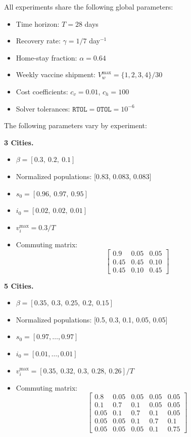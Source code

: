 \documentclass[letterpaper, 10 pt, conference]{ieeeconf}
\begin{document}
All experiments share the following global parameters:
\begin{itemize}
  \item Time horizon: $T = 28$ days
  \item Recovery rate: $\gamma = 1/7$ day$^{-1}$
  \item Home-stay fraction: $\alpha = 0.64$
  \item Weekly vaccine shipment: $V_w^{\max} = \{1, 2, 3, 4\} / 30$
  \item Cost coefficients: $c_v = 0.01$, $c_h = 100$
  \item Solver tolerances: $\texttt{RTOL} = \texttt{OTOL} = 10^{-6}$
\end{itemize}

The following parameters vary by experiment:

\textbf{3 Cities.}
\begin{itemize}
  \item $\beta = [0.3,\ 0.2,\ 0.1]$
  \item Normalized populations: [0.83, 0.083, 0.083]
  \item $s_0 = [0.96,\ 0.97,\ 0.95]$
  \item $i_0 = [0.02,\ 0.02,\ 0.01]$
  \item $v_i^{\max} = 0.3 / T$
  \item Commuting matrix:
  \[
  \begin{bmatrix}
    0.9 & 0.05 & 0.05 \\
    0.45 & 0.45 & 0.10 \\
    0.45 & 0.10 & 0.45
  \end{bmatrix}
  \]
\end{itemize}

\textbf{5 Cities.}
\begin{itemize}
  \item $\beta = [0.35,\ 0.3,\ 0.25,\ 0.2,\ 0.15]$
  \item Normalized populations: [0.5, 0.3, 0.1, 0.05, 0.05]
  \item $s_0 = [0.97,\ldots,0.97]$
  \item $i_0 = [0.01,\ldots,0.01]$
  \item $v_i^{\max} = [0.35,\ 0.32,\ 0.3,\ 0.28,\ 0.26] / T$
  \item Commuting matrix:
  \[
  \begin{bmatrix}
    0.8 &  0.05 & 0.05 & 0.05 & 0.05 \\
    0.1 &  0.7  & 0.1  & 0.05 & 0.05 \\
    0.05 & 0.1  & 0.7  & 0.1  & 0.05 \\
    0.05 & 0.05 & 0.1  & 0.7  & 0.1  \\
    0.05 & 0.05 & 0.05 & 0.1  & 0.75
  \end{bmatrix}
  \]
\end{itemize}
\end{document}
